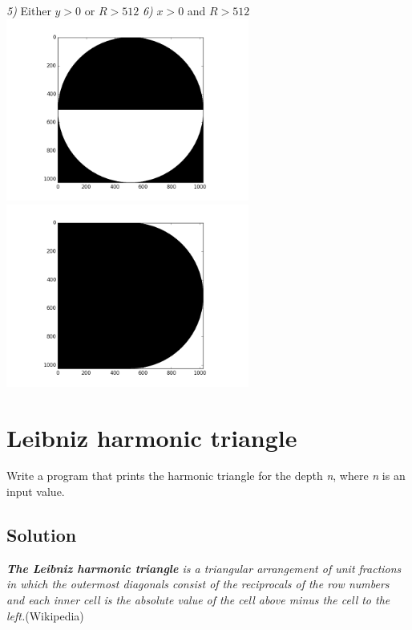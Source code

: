 \documentclass{article}
\begin{document}
    \emph{5)} Either \(y > 0\) or \(R > 512\) \hfill
    \emph{6)} \(x > 0\) and \(R > 512\)\\
    \includegraphics[width=8cm]{figure_5.png}
    \includegraphics[width=8cm]{figure_6.png}\\


  \newpage


  \section{Leibniz harmonic triangle}
    Write a program that prints the harmonic triangle for the depth \emph{n},
    where \emph{n} is an input value.

  \vspace{3em}

  \subsection{Solution}
    \textit{\textbf{The Leibniz harmonic triangle} is a triangular arrangement of unit
    fractions in which the outermost diagonals consist of the reciprocals of the
    row numbers and each inner cell is the absolute value of the cell above
    minus the cell to the left.}\hfill (Wikipedia)\\
\end{document}
